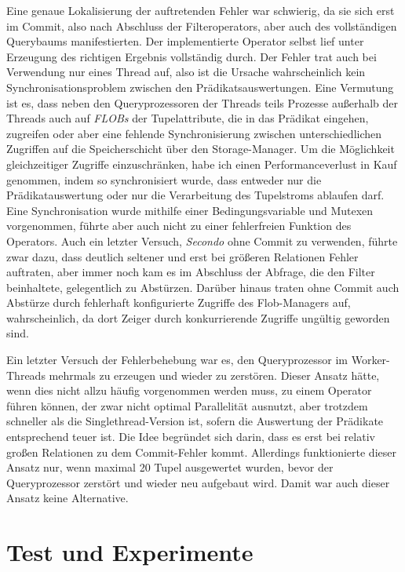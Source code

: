 \documentclass[a4paper,12pt,twoside]{article}
\newcommand{\Fb}[1]{\textit{#1}} %
\begin{document}
Eine genaue Lokalisierung der auftretenden Fehler war schwierig, da sie sich erst im Commit, also nach Abschluss der Filteroperators, aber auch des vollständigen Querybaums manifestierten. Der implementierte Operator selbst lief unter Erzeugung des richtigen Ergebnis vollständig durch. Der Fehler trat auch bei Verwendung nur eines Thread auf, also ist die Ursache wahrscheinlich kein Synchronisationsproblem zwischen den Prädikatsauswertungen. Eine Vermutung ist es, dass neben den Queryprozessoren der Threads teils Prozesse außerhalb der Threads auch auf \Fb{FLOBs} der Tupelattribute, die in das Prädikat eingehen, zugreifen oder aber eine fehlende Synchronisierung zwischen unterschiedlichen Zugriffen auf die Speicherschicht über den Storage-Manager. Um die Möglichkeit gleichzeitiger Zugriffe einzuschränken, habe ich einen Performanceverlust in Kauf genommen, indem so synchronisiert wurde, dass entweder nur die Prädikatauswertung oder nur die Verarbeitung des Tupelstroms ablaufen darf. Eine Synchronisation wurde mithilfe einer Bedingungsvariable und Mutexen vorgenommen, führte aber auch nicht zu einer fehlerfreien Funktion des Operators. Auch ein letzter Versuch, \Fb{Secondo} ohne Commit zu verwenden, führte zwar dazu, dass deutlich seltener und erst bei größeren Relationen Fehler auftraten, aber immer noch kam es im Abschluss der Abfrage, die den Filter beinhaltete, gelegentlich zu Abstürzen. Darüber hinaus traten ohne Commit auch Abstürze durch fehlerhaft konfigurierte Zugriffe des Flob-Managers auf, wahrscheinlich, da dort Zeiger durch konkurrierende Zugriffe ungültig geworden sind.

Ein letzter Versuch der Fehlerbehebung war es, den Queryprozessor im Worker-Threads mehrmals zu erzeugen und wieder zu zerstören. Dieser Ansatz hätte, wenn dies nicht allzu häufig vorgenommen werden muss, zu einem Operator führen können, der zwar nicht optimal Parallelität ausnutzt, aber trotzdem schneller als die Singlethread-Version ist, sofern die Auswertung der Prädikate entsprechend teuer ist. Die Idee begründet sich darin, dass es erst bei relativ großen Relationen zu dem Commit-Fehler kommt. Allerdings funktionierte dieser Ansatz nur, wenn maximal 20 Tupel ausgewertet wurden, bevor der Queryprozessor zerstört und wieder neu aufgebaut wird. Damit war auch dieser Ansatz keine Alternative.

\section{Test und Experimente} 
\label{te}
\end{document}
